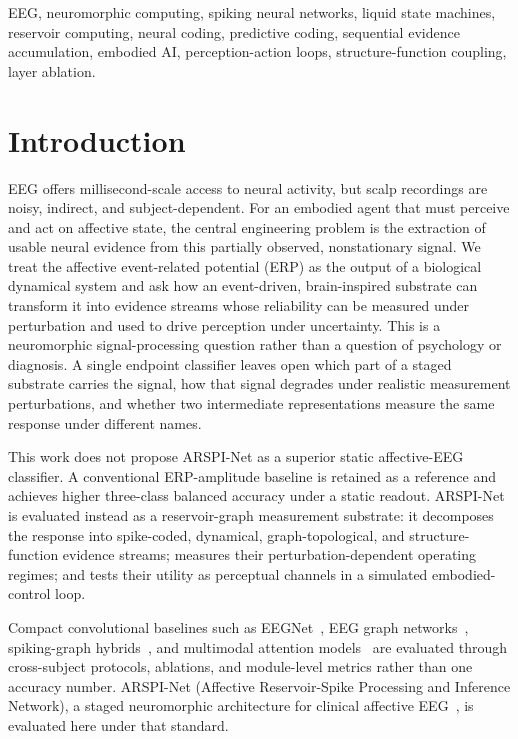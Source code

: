 \documentclass[journal]{IEEEtran}
\begin{document}
\begin{IEEEkeywords}
EEG, neuromorphic computing, spiking neural networks, liquid state machines, reservoir computing, neural coding, predictive coding, sequential evidence accumulation, embodied AI, perception-action loops, structure-function coupling, layer ablation.
\end{IEEEkeywords}

\section{Introduction}
EEG offers millisecond-scale access to neural activity, but scalp recordings are noisy, indirect, and subject-dependent. For an embodied agent that must perceive and act on affective state, the central engineering problem is the extraction of usable neural evidence from this partially observed, nonstationary signal. We treat the affective event-related potential (ERP) as the output of a biological dynamical system and ask how an event-driven, brain-inspired substrate can transform it into evidence streams whose reliability can be measured under perturbation and used to drive perception under uncertainty. This is a neuromorphic signal-processing question rather than a question of psychology or diagnosis. A single endpoint classifier leaves open which part of a staged substrate carries the signal, how that signal degrades under realistic measurement perturbations, and whether two intermediate representations measure the same response under different names.

This work does not propose ARSPI-Net as a superior static affective-EEG classifier. A conventional ERP-amplitude baseline is retained as a reference and achieves higher three-class balanced accuracy under a static readout. ARSPI-Net is evaluated instead as a reservoir-graph measurement substrate: it decomposes the response into spike-coded, dynamical, graph-topological, and structure-function evidence streams; measures their perturbation-dependent operating regimes; and tests their utility as perceptual channels in a simulated embodied-control loop.

Compact convolutional baselines such as EEGNet~\cite{lawhern2018eegnet}, EEG graph networks~\cite{klepl2024gnn,klepl2023ad}, spiking-graph hybrids~\cite{gong2023sglnet}, and multimodal attention models~\cite{guo2025mma,chiang2023depression} are evaluated through cross-subject protocols, ablations, and module-level metrics rather than one accuracy number. ARSPI-Net (Affective Reservoir-Spike Processing and Inference Network), a staged neuromorphic architecture for clinical affective EEG~\cite{lane2023arspi,lane2024arspi}, is evaluated here under that standard.
\end{document}
